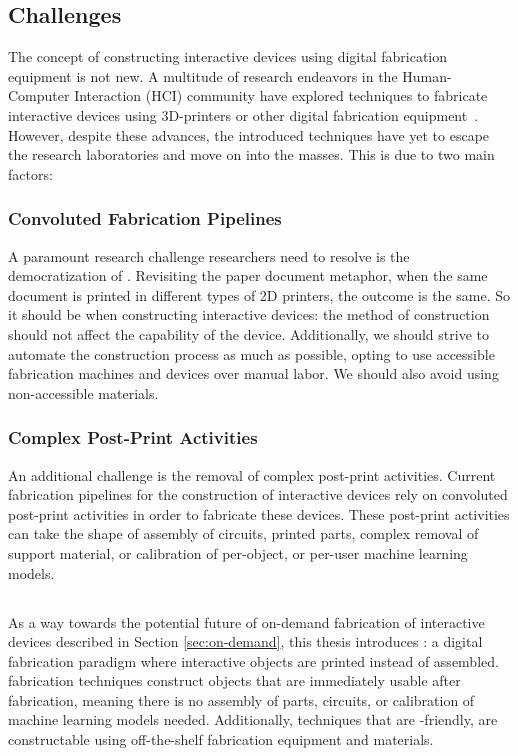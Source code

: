     \subsection{Challenges}
      The concept of constructing interactive devices using digital fabrication
      equipment is not new. A multitude of research endeavors in the
      Human-Computer Interaction (HCI) community have explored techniques to
      fabricate interactive devices using 3D-printers or other digital
      fabrication equipment~\cite{Ballagas:2018}. However, despite these
      advances, the introduced techniques have yet to escape the research
      laboratories and move on into the masses. This is due to two main factors:

      \subsubsection*{Convoluted Fabrication Pipelines}
        A paramount research challenge researchers need to resolve is the
        democratization of . Revisiting the paper document
        metaphor, when the same document is printed in different types of 2D
        printers, the outcome is the same. So it should be when constructing
        interactive devices: the method of construction should not affect the
        capability of the device. Additionally, we should strive to automate the
        construction process as much as possible, opting to use accessible
        fabrication machines and devices over manual labor. We should also avoid
        using non-accessible materials.

      \subsubsection*{Complex Post-Print Activities}
        An additional challenge is the removal of complex post-print activities.
        Current fabrication pipelines for the construction of interactive
        devices rely on convoluted post-print activities in order to fabricate
        these devices. These post-print activities can take the shape of
        assembly of circuits, printed parts, complex removal of support
        material, or calibration of per-object, or per-user machine learning
        models.
      
    \subsection{\papf}
      As a way towards the potential future of on-demand fabrication of
      interactive devices described in Section \ref{sec:on-demand}, this thesis
      introduces \papf: a digital fabrication paradigm where interactive objects
      are printed instead of assembled. \pap fabrication techniques construct
      objects that are immediately usable after fabrication, meaning there is no
      assembly of parts, circuits, or calibration of machine learning models
      needed. Additionally, techniques that are \pap-friendly, are constructable
      using off-the-shelf fabrication equipment and materials.

